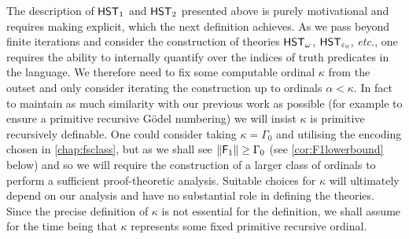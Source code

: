 \documentclass[UKenglish,cleveref,DIV=12]{scrartcl}
\theoremstyle{definition}
\theoremstyle{definition}
\begin{document}
The description of $\mathsf{HST}_1$ and $\mathsf{HST}_2$ presented above is purely motivational and requires making
explicit, which the next definition achieves.
As we pass beyond finite iterations and consider the construction of theories
$\mathsf{HST}_\omega$, $\mathsf{HST}_{\varepsilon_0}$, \emph{etc.},  one requires the ability
to internally quantify over the indices of truth predicates in the language. We
therefore need to fix some computable ordinal $\kappa$ from the outset and only
consider iterating the construction up to ordinals $\alpha<\kappa$. In fact to
maintain as much similarity with our previous work as possible ({for
example to ensure a primitive recursive Gödel numbering}) we will insist $\kappa$ is
primitive recursively definable. One could consider taking $\kappa=\Gamma_0$ and
utilising the encoding chosen in \cref{chap:fsclass}, but as we shall see
$\lVert{\mathsf{F}_1}\rVert\ge\Gamma_0$ (see \cref{cor:F1lowerbound} below) and so we will
require the construction of a larger class of ordinals to perform a sufficient
proof-theoretic analysis. Suitable choices for $\kappa$ will ultimately depend on our
analysis and have no substantial role in defining the theories. Since the
precise definition of $\kappa$ is not essential for the definition, we shall
assume for the time being that $\kappa$ represents some fixed primitive
recursive ordinal.
\end{document}

